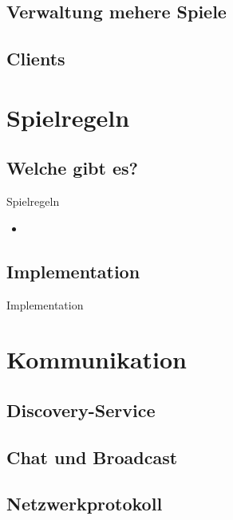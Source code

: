 \documentclass[12pt, utf8]{beamer}
\begin{document}
\subsection{Verwaltung mehere Spiele}


\subsection{Clients}

\section{Spielregeln}
\subsection{Welche gibt es?}
\begin{frame}{Spielregeln}
\begin{itemize}
\item 
\end{itemize}
\end{frame}
\subsection{Implementation}
\begin{frame}{Implementation}

\end{frame}

\section{Kommunikation}
\subsection{Discovery-Service}
\begin{frame}

\end{frame}
\subsection{Chat und Broadcast}
\begin{frame}

\end{frame}
\subsection{Netzwerkprotokoll}
\begin{frame}

\end{frame}
\end{document}
